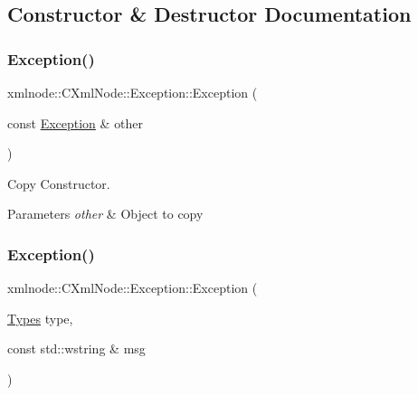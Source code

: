 \subsection{Constructor \& Destructor Documentation}
\mbox{\label{classxmlnode_1_1_c_xml_node_1_1_exception_aaefc2a485cf66513101ac27c2389c819}} 
\subsubsection{\texorpdfstring{Exception()}{Exception()}\hspace{0.1cm}{\footnotesize\ttfamily [1/2]}}
{\footnotesize\ttfamily xmlnode\+::\+C\+Xml\+Node\+::\+Exception\+::\+Exception (\begin{DoxyParamCaption}\item[{const \mbox{\hyperlink{classxmlnode_1_1_c_xml_node_1_1_exception}{Exception}} \&}]{other }\end{DoxyParamCaption})\hspace{0.3cm}{\ttfamily [inline]}}



Copy Constructor. 


\begin{DoxyParams}{Parameters}
{\em other} & Object to copy \\
\hline
\end{DoxyParams}
\mbox{\label{classxmlnode_1_1_c_xml_node_1_1_exception_ad660bb87054a9483c0933efbaddfaa55}} 
\subsubsection{\texorpdfstring{Exception()}{Exception()}\hspace{0.1cm}{\footnotesize\ttfamily [2/2]}}
{\footnotesize\ttfamily xmlnode\+::\+C\+Xml\+Node\+::\+Exception\+::\+Exception (\begin{DoxyParamCaption}\item[{\mbox{\hyperlink{classxmlnode_1_1_c_xml_node_1_1_exception_abdbe07531ef4b19192f1fa2f819ed75f}{Types}}}]{type,  }\item[{const std\+::wstring \&}]{msg }\end{DoxyParamCaption})\hspace{0.3cm}{\ttfamily [inline]}}



